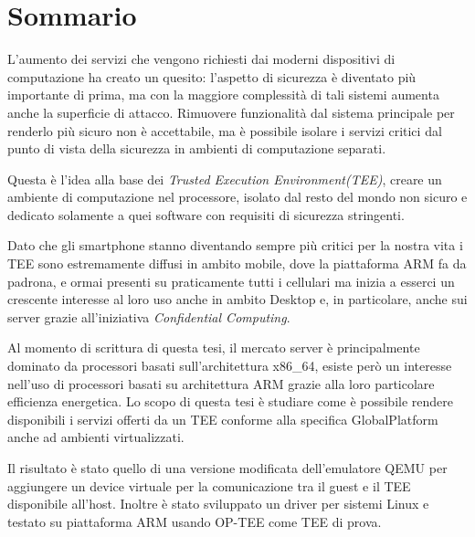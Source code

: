 \documentclass[12pt,italian]{report}
\begin{document}
\frontespizio
\afterpreface

\chapter*{Sommario}
\label{cap:sommario}
L'aumento dei servizi che vengono richiesti dai moderni dispositivi di
computazione ha creato un quesito: l'aspetto di sicurezza è diventato più
importante di prima, ma con la maggiore complessità di tali sistemi aumenta
anche la superficie di attacco.
Rimuovere funzionalità dal sistema principale per renderlo più sicuro non
è accettabile, ma è possibile isolare i servizi critici dal punto di vista
della sicurezza in ambienti di computazione separati.

Questa è l'idea alla base dei \textit{Trusted Execution Environment(TEE)},
creare un ambiente di computazione nel processore, isolato dal resto del
mondo non sicuro e dedicato solamente a quei software con requisiti di
sicurezza stringenti.

Dato che gli smartphone stanno diventando sempre più critici per la nostra vita
i TEE sono estremamente diffusi in ambito mobile, dove la piattaforma ARM fa da
padrona, e ormai presenti su praticamente tutti i cellulari ma inizia a esserci
un crescente interesse al loro uso anche in ambito Desktop e, in particolare,
anche sui server grazie all'iniziativa \textit{Confidential Computing}.

Al momento di scrittura di questa tesi, il mercato server è principalmente
dominato da processori basati sull'architettura x86\_64, esiste però un
interesse nell'uso di processori basati su architettura ARM grazie alla loro
particolare efficienza energetica.
Lo scopo di questa tesi è studiare come è possibile rendere disponibili i
servizi offerti da un TEE conforme alla specifica GlobalPlatform anche ad
ambienti virtualizzati.

Il risultato è stato quello di una versione modificata dell'emulatore QEMU
per aggiungere un device virtuale per la comunicazione tra il guest e il TEE
disponibile all'host. Inoltre è stato sviluppato un driver per sistemi Linux
e testato su piattaforma ARM usando OP-TEE come TEE di prova.
\end{document}

